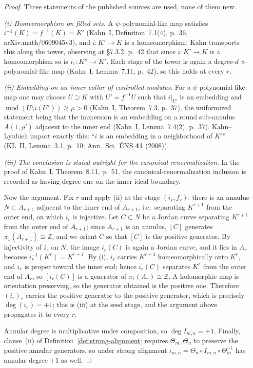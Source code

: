 \documentclass[11pt,reqno]{amsart}
\theoremstyle{definition}
\theoremstyle{remark}
\begin{document}
\begin{proof}
Three statements of the published sources are used, none of them new.

\emph{(i) Homeomorphism on filled sets.}  A \(\psi\)-polynomial-like map satisfies \(i^{-1}(K)=f^{-1}(K)=K'\) (Kahn~I, Definition~7.1(4), p.~36, arXiv:math/0609045v3), and \(i\colon K'\to K\) is a homeomorphism; Kahn transports this along the tower, observing at \S7.3.2, p.~42 that since \(i\colon K'\to K\) is a homeomorphism so is \(i_1\colon K''\to K'\).  Each stage of the tower is again a degree-\(d\) \(\psi\)-polynomial-like map (Kahn~I, Lemma~7.11, p.~42), so this holds at every \(r\).

\emph{(ii) Embedding on an inner collar of controlled modulus.}  For a \(\psi\)-polynomial-like map one may choose \(U\supset K\) with \(U'=f^{-1}U\) such that \(i|_{U'}\) is an embedding and \(\operatorname{mod}(U\setminus i(U'))\ge\mu>0\) (Kahn~I, Theorem~7.3, p.~37), the uniformized statement being that the immersion is an embedding on a round sub-annulus \(A(1,\rho')\) adjacent to the inner end (Kahn~I, Lemma~7.4(2), p.~37).  Kahn--Lyubich import exactly this: ``\(i\) is an embedding in a neighborhood of \(K'\)'' (KL~II, Lemma~3.1, p.~10; Ann.\ Sci.\ \'ENS \textbf{41} (2008)).

\emph{(iii) The conclusion is stated outright for the canonical renormalization.}  In the proof of Kahn~I, Theorem~8.11, p.~51, the canonical-renormalization inclusion is recorded as having degree one on the inner ideal boundary.

Now the argument.  Fix \(r\) and apply (ii) at the stage \((i_r,f_r)\): there is an annulus \(N\subset A_{r+1}\) adjacent to the inner end of \(A_{r+1}\), i.e.\ separating \(K^{r+1}\) from the outer end, on which \(i_r\) is injective.  Let \(C\subset N\) be a Jordan curve separating \(K^{r+1}\) from the outer end of \(A_{r+1}\); since \(A_{r+1}\) is an annulus, \([C]\) generates \(\pi_1(A_{r+1})\cong\mathbb Z\), and we orient \(C\) so that \([C]\) is the positive generator.  By injectivity of \(i_r\) on \(N\), the image \(i_r(C)\) is again a Jordan curve, and it lies in \(A_r\) because \(i_r^{-1}(K^r)=K^{r+1}\).  By (i), \(i_r\) carries \(K^{r+1}\) homeomorphically onto \(K^r\), and \(i_r\) is proper toward the inner end; hence \(i_r(C)\) separates \(K^r\) from the outer end of \(A_r\), so \([i_r(C)]\) is a generator of \(\pi_1(A_r)\cong\mathbb Z\).  A holomorphic map is orientation preserving, so the generator obtained is the positive one.  Therefore \((i_r)_*\) carries the positive generator to the positive generator, which is precisely \(\deg(i_r)=+1\); this is (iii) at the seed stage, and the argument above propagates it to every \(r\).

Annular degree is multiplicative under composition, so \(\deg I_{m,n}=+1\).  Finally, clause~(ii) of Definition~\ref{def:strong-alignment} requires \(\Theta_m,\Theta_n\) to preserve the positive annular generators, so under strong alignment \(\iota_{m,n}=\Theta_n\circ I_{m,n}\circ\Theta_m^{-1}\) has annular degree \(+1\) as well.
\end{proof}
\end{document}
